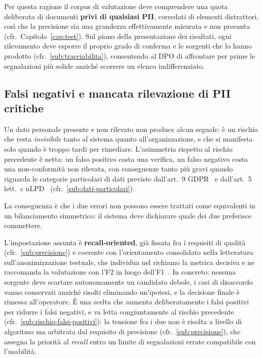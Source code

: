 Per questa ragione il corpus di valutazione deve comprendere una quota deliberata di documenti \textbf{privi di qualsiasi PII}, corredati di elementi distrattori, così che la precisione sia una grandezza effettivamente misurata e non presunta (cfr.~Capitolo~\ref{cap:test}). Sul piano della presentazione dei risultati, ogni rilevamento deve esporre il proprio grado di conferma e le sorgenti che lo hanno prodotto (cfr.~\ref{sub:tracciabilita}), consentendo al DPO di affrontare per prime le segnalazioni più solide anziché scorrere un elenco indifferenziato.

\subsection{Falsi negativi e mancata rilevazione di PII critiche}
\label{sub:rischio-falsi-negativi}
Un dato personale presente e non rilevato non produce alcun segnale: è un rischio che resta \emph{invisibile} tanto al sistema quanto all'organizzazione, e che si manifesta solo quando è troppo tardi per rimediare. L'asimmetria rispetto al rischio precedente è netta: un falso positivo costa una verifica, un falso negativo costa una non-conformità non rilevata, con conseguenze tanto più gravi quando riguarda le categorie particolari di dati previste dall'art.~9 GDPR~\cite{RegolamentoUE20162016} e dall'art.~5 lett.~c nLPD~\cite{RS2351Legge} (cfr.~\ref{sub:dati-particolari}). \medskip

La conseguenza è che i due errori non possono essere trattati come equivalenti in un bilanciamento simmetrico: il sistema deve dichiarare quale dei due preferisce commettere. \medskip

L'impostazione assunta è \textbf{recall-oriented}, già fissata fra i requisiti di qualità (cfr.~\ref{sub:precisione}) e coerente con l'orientamento consolidato nella letteratura sull'anonimizzazione testuale, che individua nel richiamo la metrica decisiva e ne raccomanda la valutazione con l'F2 in luogo dell'F1~\cite{pilanTextAnonymizationBenchmark2022}. In concreto: nessuna sorgente deve scartare autonomamente un candidato debole, i casi di disaccordo vanno conservati anziché risolti eliminando un'ipotesi, e la decisione finale è rimessa all'operatore. È una scelta che aumenta deliberatamente i falsi positivi per ridurre i falsi negativi, e va letta congiuntamente al rischio precedente (cfr.~\ref{sub:rischio-falsi-positivi}): la tensione fra i due non è risolta a livello di algoritmo ma arbitrata dal requisito di precisione (cfr.~\ref{sub:precisione}), che assegna la priorità al \textit{recall} entro un limite di segnalazioni errate compatibile con l'usabilità.


